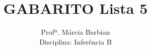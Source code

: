 \documentclass[10pt,brazil,addpoints]{exam}
\begin{document}
\title{GABARITO Lista 5}


\author{
  Profª. Márcia Barbian \\
  Disciplina: Inferência B\\
  \date{}
}


\maketitle
\end{document}
